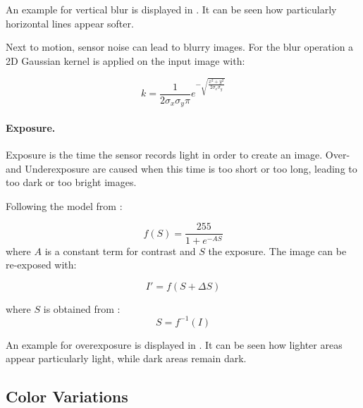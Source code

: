 An example for vertical blur is displayed in . It can be seen how particularly horizontal lines appear softer.

Next to motion, sensor noise can lead to blurry images. For the blur operation a 2D Gaussian kernel is applied on the input image with:

\begin{equation}
k = \frac{1}{2\sigma_x\sigma_y\pi}e^{-\sqrt{\frac{x^2 + y^2}{2\sigma_x\sigma_y}}} 
\end{equation}
\paragraph{Exposure.}

Exposure is the time the sensor records light in order to create an image. Over- and Underexposure are caused when this time is too short or too long, leading to too dark or too bright images.

Following the model from \cite{Carlson2018}:

\begin{equation}
f(S) = \frac{255}{1 + e^{-A S}}
\end{equation}
where $A$ is a constant term for contrast and $S$ the exposure.
The image can be re-exposed with:

\begin{equation}
I' = f(S+\Delta S)
\end{equation}

where $S$ is obtained from :
\begin{equation}
S = f^{-1}(I)
\end{equation}

An example for overexposure is displayed in . It can be seen how lighter areas appear particularly light, while dark areas remain dark.

\subsection{Color Variations}



